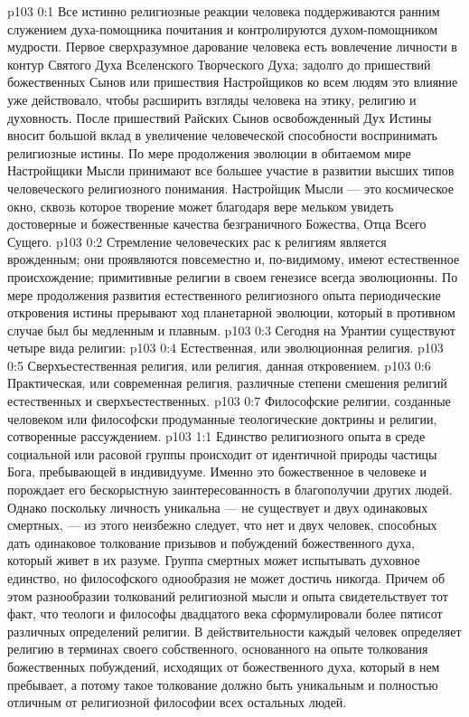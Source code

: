 \author{Мелхиседек}
\vs p103 0:1 Все истинно религиозные реакции человека поддерживаются ранним служением духа\hyp{}помощника почитания и контролируются духом\hyp{}помощником мудрости. Первое сверхразумное дарование человека есть вовлечение личности в контур Святого Духа Вселенского Творческого Духа; задолго до пришествий божественных Сынов или пришествия Настройщиков ко всем людям это влияние уже действовало, чтобы расширить взгляды человека на этику, религию и духовность. После пришествий Райских Сынов освобожденный Дух Истины вносит большой вклад в увеличение человеческой способности воспринимать религиозные истины. По мере продолжения эволюции в обитаемом мире Настройщики Мысли принимают все большее участие в развитии высших типов человеческого религиозного понимания. Настройщик Мысли --- это космическое окно, сквозь которое творение может благодаря вере мельком увидеть достоверные и божественные качества безграничного Божества, Отца Всего Сущего.
\vs p103 0:2 Стремление человеческих рас к религиям является врожденным; они проявляются повсеместно и, по\hyp{}видимому, имеют естественное происхождение; примитивные религии в своем генезисе всегда эволюционны. По мере продолжения развития естественного религиозного опыта периодические откровения истины прерывают ход планетарной эволюции, который в противном случае был бы медленным и плавным.
\vs p103 0:3 \pc Сегодня на Урантии существуют четыре вида религии:
\vs p103 0:4 \bibnobreakspace Естественная, или эволюционная религия.
\vs p103 0:5 \bibnobreakspace Сверхъестественная религия, или религия, данная откровением.
\vs p103 0:6 \bibnobreakspace Практическая, или современная религия, различные степени смешения религий естественных и сверхъестественных.
\vs p103 0:7 \bibnobreakspace Философские религии, созданные человеком или философски продуманные теологические доктрины и религии, сотворенные рассуждением.
\vs p103 1:1 Единство религиозного опыта в среде социальной или расовой группы происходит от идентичной природы частицы Бога, пребывающей в индивидууме. Именно это божественное в человеке и порождает его бескорыстную заинтересованность в благополучии других людей. Однако поскольку личность уникальна --- не существует и двух одинаковых смертных, --- из этого неизбежно следует, что нет и двух человек, способных дать одинаковое толкование призывов и побуждений божественного духа, который живет в их разуме. Группа смертных может испытывать духовное единство, но философского однообразия не может достичь никогда. Причем об этом разнообразии толкований религиозной мысли и опыта свидетельствует тот факт, что теологи и философы двадцатого века сформулировали более пятисот различных определений религии. В действительности каждый человек определяет религию в терминах своего собственного, основанного на опыте толкования божественных побуждений, исходящих от божественного духа, который в нем пребывает, а потому такое толкование должно быть уникальным и полностью отличным от религиозной философии всех остальных людей.
